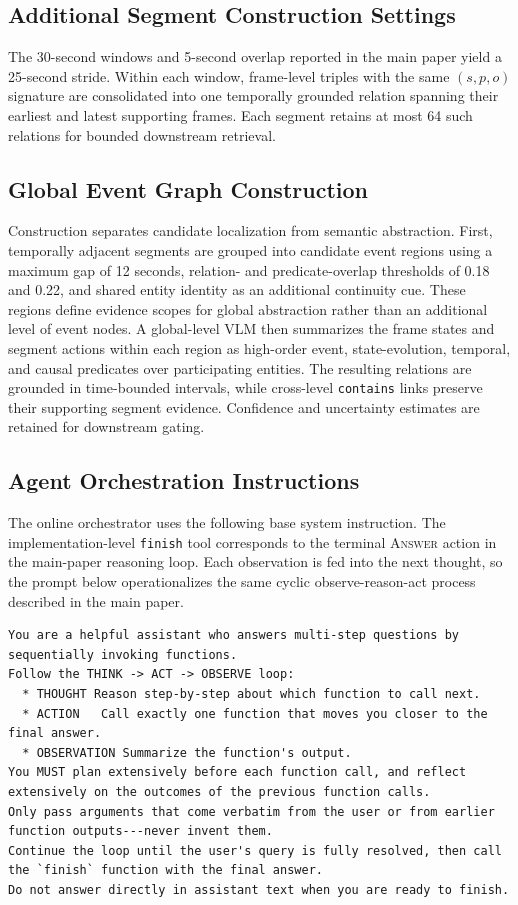 \subsection{Additional Segment Construction Settings}

The 30-second windows and 5-second overlap reported in the main paper yield a 25-second stride.
Within each window, frame-level triples with the same $(s,p,o)$ signature are consolidated into one temporally grounded relation spanning their earliest and latest supporting frames.
Each segment retains at most 64 such relations for bounded downstream retrieval.

\subsection{Global Event Graph Construction}

Construction separates candidate localization from semantic abstraction.
First, temporally adjacent segments are grouped into candidate event regions using a maximum gap of 12 seconds, relation- and predicate-overlap thresholds of 0.18 and 0.22, and shared entity identity as an additional continuity cue.
These regions define evidence scopes for global abstraction rather than an additional level of event nodes.
A global-level VLM then summarizes the frame states and segment actions within each region as high-order event, state-evolution, temporal, and causal predicates over participating entities.
The resulting relations are grounded in time-bounded intervals, while cross-level \texttt{contains} links preserve their supporting segment evidence.
Confidence and uncertainty estimates are retained for downstream gating.

\subsection{Agent Orchestration Instructions}

The online orchestrator uses the following base system instruction.
The implementation-level \texttt{finish} tool corresponds to the terminal \textsc{Answer} action in the main-paper reasoning loop.
Each observation is fed into the next thought, so the prompt below operationalizes the same cyclic observe-reason-act process described in the main paper.

\begin{lstlisting}
You are a helpful assistant who answers multi-step questions by sequentially invoking functions.
Follow the THINK -> ACT -> OBSERVE loop:
  * THOUGHT Reason step-by-step about which function to call next.
  * ACTION   Call exactly one function that moves you closer to the final answer.
  * OBSERVATION Summarize the function's output.
You MUST plan extensively before each function call, and reflect extensively on the outcomes of the previous function calls.
Only pass arguments that come verbatim from the user or from earlier function outputs---never invent them.
Continue the loop until the user's query is fully resolved, then call the `finish` function with the final answer.
Do not answer directly in assistant text when you are ready to finish.
\end{lstlisting}

